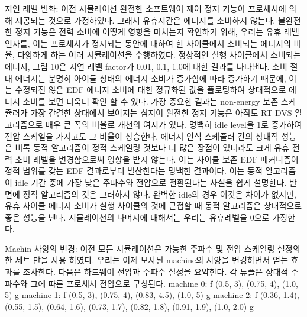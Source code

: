 \documentclass[11pt
  , a4paper
  , article
  , oneside
]{memoir}
\begin{document}
지연 레벨 변화:
이전 시뮬레이션 완전한 소프트웨어 제어 정지 기능이 프로세서에 의해 제공되는 것으로 가정하였다. 그래서 유휴시간은 에너지를 소비하지 않는다. 불완전한 정지 기능은 전력 소비에 어떻게 영향을 미치는지 확인하기 위해, 우리는 유휴 레벨 인자를, 이는 프로세서가 정지되는 동안에 대하여 한 사이클에서 소비되는 에너지의 비율, 다양하게 하는 여러 시뮬레이션을 수행하였다. 정상적인 실행 사이클에서 소비되는 에너지, 그림 10은 지연 레벨 factor가 0.01, 0.1, 1.0에 대한 결과를 나타낸다. 소비 절대 에너지는 분명히 아이들 상태의 에너지 소비가 증가함에 따라 증가하기 때문에, 이는 수정되진 않은 EDF 에너지 소비에 대한 정규화된 값을 플로팅하여 상대적으로 에너지 소비를 보면 더욱더 확인 할 수 있다. 가장 중요한 결과는 non-energy 보존 스케쥴러가 가장 간결한 상태에서 보여지는 심지어 완전한 정지 기능은 아직도 RT-DVS 알고리즘으로 매우 큰 폭의 비율로 개선의 여지가 있다. 명백히 idle level을 1로 증가하여 전압 스케일을 가지고도 그 비율이 상승한다. 에너지 인식 스케줄러 간의 상대적 성능은 비록 동적 알고리즘이 정적 스케일링 것보다 더 많은 장점이 있더라도 크게 유휴 전력 소비 레벨을 변경함으로써 영향을 받지 않는다.
이는 사이클 보존 EDF 메커니즘이 정적 범위를 갖는 EDF 결과로부터 발산한다는 명백한 결과이다. 이는 동적 알고리즘이 idle 기간 중에 가장 낮은 주파수와 전압으로 전환된다는 사실을 쉽게 설명한다. 반면에 정적 알고리즘의 것은 그러하지 않다. 완벽한 idle의 경우 이것은 차이가 없지만, 
유휴 사이클 에너지 소비가 실행 사이클의 것에 근접할 때 동적 알고리즘은 상대적으로 좋은 성능을 낸다. 시뮬레이션의 나머지에 대해서는 우리는 유휴레벨을 0으로 가정한다. 

Machin 사양의 변경:
이전 모든 시뮬레이션은 가능한 주파수 및 전압 스케일링 설정의 한 세트 만을 사용 하였다. 우리는 이제 모사된 machine의 사양을 변경하면서 얻는 효과를 조사한다. 다음은 하드웨어 전압과 주파수 설정을 요약한다. 각 튜플은 상대적 주파수와 그에 따른 프로세서 전압으로 구성된다.
machine 0: f (0.5, 3), (0.75, 4), (1.0, 5) g
machine 1: f (0.5, 3), (0.75, 4), (0.83, 4.5), (1.0, 5) g
machine 2: f (0.36, 1.4), (0.55, 1.5), (0.64, 1.6),
(0.73, 1.7), (0.82, 1.8), (0.91, 1.9), (1.0, 2.0) g 
\end{document}
